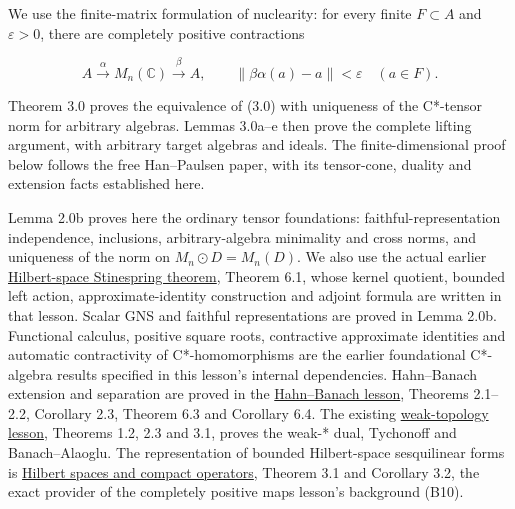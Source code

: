 \documentclass[
  11pt,
]{article}
\begin{document}
We use the finite-matrix formulation of nuclearity: for every finite
\(F\subset A\) and \(\varepsilon>0\), there are completely positive
contractions

\[
A\overset{\alpha}{\longrightarrow}M_n(\mathbb C)
\overset{\beta}{\longrightarrow}A,
\qquad \|\beta\alpha(a)-a\|<\varepsilon\quad(a\in F).
\tag{3.0}
\]

Theorem 3.0 proves the equivalence of (3.0) with uniqueness of the
C*-tensor norm for arbitrary algebras. Lemmas 3.0a--e then prove the
complete lifting argument, with arbitrary target algebras and ideals.
The finite-dimensional proof below follows the free Han--Paulsen paper,
with its tensor-cone, duality and extension facts established here.

Lemma 2.0b proves here the ordinary tensor foundations:
faithful-representation independence, inclusions, arbitrary-algebra
minimality and cross norms, and uniqueness of the norm on
\(M_n\odot D=M_n(D)\). We also use the actual earlier
\href{https://kokunoyumeto.github.io/open-math-courses/courses/foundations-of-von-neumann-algebras/completely-positive-maps.html}{Hilbert-space
Stinespring theorem}, Theorem 6.1, whose kernel quotient, bounded left
action, approximate-identity construction and adjoint formula are
written in that lesson. Scalar GNS and faithful representations are
proved in Lemma 2.0b. Functional calculus, positive square roots,
contractive approximate identities and automatic contractivity of
C*-homomorphisms are the earlier foundational C*-algebra results
specified in this lesson's internal dependencies. Hahn--Banach extension
and separation are proved in the
\href{https://kokunoyumeto.github.io/open-math-courses/courses/foundations-of-von-neumann-algebras/hahn-banach-baire-and-the-basic-theorems-on-banach-spaces.html}{Hahn--Banach
lesson}, Theorems 2.1--2.2, Corollary 2.3, Theorem 6.3 and Corollary
6.4. The existing
\href{https://kokunoyumeto.github.io/open-math-courses/courses/foundations-of-von-neumann-algebras/weak-topologies-tychonoff-banach-alaoglu-mazur-bipolars-krein-milman-and-eberlein-smulian.html}{weak-topology
lesson}, Theorems 1.2, 2.3 and 3.1, proves the weak-* dual, Tychonoff
and Banach--Alaoglu. The representation of bounded Hilbert-space
sesquilinear forms is
\href{https://kokunoyumeto.github.io/open-math-courses/courses/foundations-of-von-neumann-algebras/hilbert-spaces-and-compact-operators.html}{Hilbert
spaces and compact operators}, Theorem 3.1 and Corollary 3.2, the exact
provider of the completely positive maps lesson's background (B10).
\end{document}
